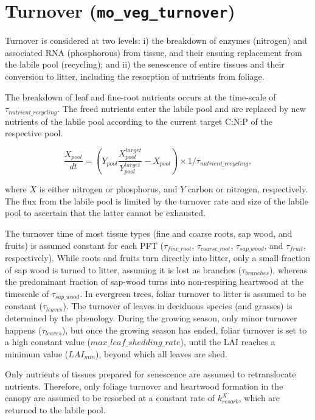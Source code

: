 \section{Turnover (\texttt{mo\_veg\_turnover})}\label{veg:sec:turnover}

Turnover is considered at two levels: i) the breakdown of enzymes (nitrogen) and associated RNA (phosphorous) from tissue, and their ensuing replacement from the labile pool (recycling); and ii) the senescence of entire tissues and their conversion to litter, including the resorption of nutrients from foliage. 

The breakdown of leaf and fine-root nutrients occurs at the time-scale of $\tau_{{nutrient}\_{recycling}}$. The freed nutrients enter the labile pool and are replaced by new nutrients of the labile pool according to the current target C:N:P of the respective pool. 

\begin{equation}
\frac{X_{pool}}{dt} = (Y_{pool} \frac{X_{pool}^{target}}{Y_{pool}^{target}} - X_{pool}) \times 1/\tau_{{nutrient}\_{recycling}},
\end{equation}

where $X$ is either nitrogen or phosphorus, and $Y$ carbon or nitrogen, respectively. The flux from the labile pool is limited by the turnover rate and size of the labile pool to ascertain that the latter cannot be exhausted.  

The turnover time of most tissue types (fine and coarse roots, sap wood, and fruits) is assumed constant for each PFT ($\tau_{fine\_root}$, $\tau_{coarse\_root}$, $\tau_{sap\_wood}$, and $\tau_{fruit}$, respectively). While roots and fruits turn directly into litter, only a small fraction of sap wood is turned to litter, assuming it is lost as branches ($\tau_{branches}$), whereas the predominant fraction of sap-wood turns into non-respiring heartwood at the timescale of $\tau_{sap\_wood}$. In evergreen trees, foliar turnover to litter is assumed to be constant ($\tau_{leaves}$). The turnover of leaves in deciduous species (and grasses) is determined by the phenology. During the growing season, only minor turnover happens ($\tau_{leaves}$), but once the growing season has ended, foliar turnover is set to a high constant value ($max\_{leaf}\_{shedding}\_{rate}$), until the LAI reaches a minimum value ($LAI_{min}$), beyond which all leaves are shed. 

Only nutrients of tissues prepared for senescence are assumed to retranslocate nutrients. Therefore, only foliage turnover and heartwood formation in the canopy are assumed to be resorbed at a constant rate of $k_{resorb}^{X}$, which are returned to the labile pool.

